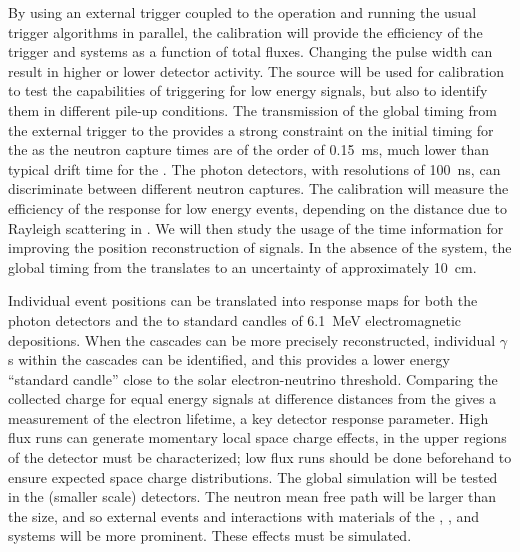 By using an external trigger coupled to the  operation and running the usual trigger algorithms in parallel, the calibration will provide the efficiency of the trigger and  systems as a function of total fluxes. Changing the pulse width can result in 
higher or lower detector activity. The source will be used for  calibration to test
the capabilities of triggering for low energy signals, but also 
to identify them in different pile-up conditions.
The transmission of the global timing from the external  trigger to the  provides a strong constraint on the initial timing for the 
as the neutron capture times are of the order of \SI{0.15}{\milli\s}, much lower than typical drift time for the . The photon detectors, with resolutions of \SI{100}{\nano\s}, can discriminate between different neutron captures. The calibration will measure the efficiency of the  response for low energy events, depending on the distance due to Rayleigh scattering in \lar. %
We will then study the usage of the  time information for improving the position reconstruction of  signals. In the absence of the  system, the global timing from the  translates to an uncertainty of approximately \SI{10}{\cm}.

Individual event positions can be translated into response maps for both the photon detectors and the  to standard candles of \SI{6.1}{\MeV} electromagnetic depositions. When the cascades can be more precisely reconstructed, individual $\gamma$s within the cascades can be identified, and this provides a lower energy ``standard candle'' close to the solar electron-neutrino threshold. Comparing the collected charge for equal energy signals at difference distances from the  gives a measurement of the electron lifetime, a key detector response parameter. High  flux runs can generate momentary local space charge effects, in the
upper regions of the detector must be characterized; low flux runs should be done beforehand to ensure 
expected space charge distributions.
The global simulation will be tested in the (smaller scale)  detectors. The neutron mean free path will be larger than the  size, and so 
external events and interactions with materials of the , , and  systems will be more prominent. These effects must be simulated.

